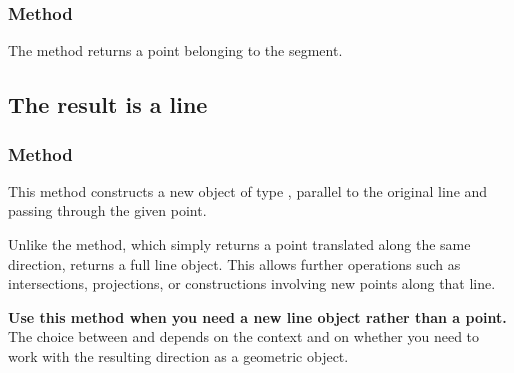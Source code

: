 

\subsubsection{Method } %
\label{ssub:method_line_random}
The method returns a point belonging to the segment.


\subsection{The result is a line} %

\subsubsection{Method } %
\label{ssub_line_from_a_defined_line}

This method constructs a new object of type , parallel to the original line and passing through the given point.

\medskip
\noindent
Unlike the  method, which simply returns a point translated along the same direction,  returns a full line object. This allows further operations such as intersections, projections, or constructions involving new points along that line.

\medskip
\noindent
\textbf{Use this method when you need a new line object rather than a point.} The choice between  and  depends on the context and on whether you need to work with the resulting direction as a geometric object.

\begin{minipage}{.5\textwidth}
\begin{center}
\end{center}
\end{minipage}
\begin{minipage}{.5\textwidth}
\begin{tkzexample}
\end{tkzexample}
\end{minipage}


